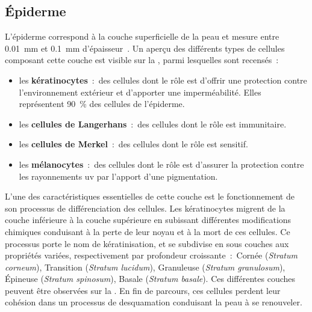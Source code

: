 \subsection{Épiderme}
L’épiderme correspond à la couche superficielle de la peau et mesure entre \SI{0,01}{\milli\metre} et \SI{0,1}{\milli\metre} d’épaisseur~\cite{SandbyMoller2003}. Un aperçu des différents types de cellules composant cette couche est visible sur la , parmi lesquelles sont recensés~:
\begin{itemize}
    \item les \textbf{kératinocytes}~:~des cellules dont le rôle est d'offrir une protection contre l'environnement extérieur et d'apporter une imperméabilité. Elles représentent 90~\% des cellules de l'épiderme.
    \item les \textbf{cellules de Langerhans}~:~des cellules dont le rôle est immunitaire.
    \item les \textbf{cellules de Merkel}~:~des cellules dont le rôle est sensitif.
    \item les \textbf{mélanocytes}~:~des cellules dont le rôle est d'assurer la protection contre les rayonnements \gls{uv} par l'apport d'une pigmentation.
\end{itemize}\par

L'une des caractéristiques essentielles de cette couche est le fonctionnement de son processus de différenciation des cellules. Les kératinocytes migrent de la couche inférieure à la couche supérieure en subissant différentes modifications chimiques conduisant à la perte de leur noyau et à la mort de ces cellules. Ce processus porte le nom de kératinisation, et se subdivise en sous couches aux propriétés variées, respectivement par profondeur croissante~:~Cornée (\textit{Stratum corneum}), Transition (\textit{Stratum lucidum}), Granuleuse (\textit{Stratum granulosum}), Épineuse (\textit{Stratum spinosum}), Basale (\textit{Stratum basale}). Ces différentes couches peuvent être observées sur la . En fin de parcours, ces cellules perdent leur cohésion dans un processus de desquamation conduisant la peau à se renouveler.\par

